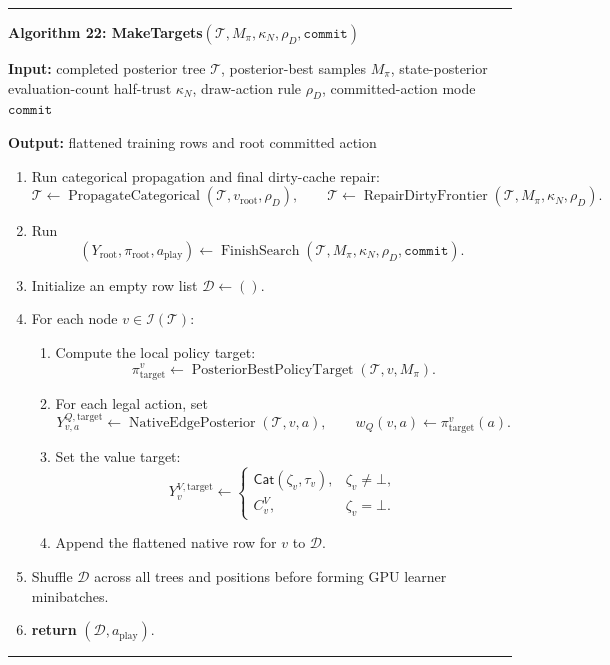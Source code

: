 \documentclass[11pt]{article}
\newcommand{\Tree}{\mathcal{T}}
\newcommand{\Interior}{\mathcal{I}}
\newcommand{\PosteriorBestPolicyTarget}{\operatorname{PosteriorBestPolicyTarget}}
\newcommand{\FinishSearch}{\operatorname{FinishSearch}}
\newcommand{\RepairDirtyFrontier}{\operatorname{RepairDirtyFrontier}}
\newcommand{\CatObj}{\mathsf{Cat}}
\newcommand{\NativeEdgePosterior}{\operatorname{NativeEdgePosterior}}
\newcommand{\PropagateCategorical}{\operatorname{PropagateCategorical}}
\newenvironment{algorithmblock}[1]
{
  \par\medskip
  \noindent\hrule\par\smallskip
  \noindent\textbf{#1}
  \par\smallskip
}
{
  \par\smallskip\noindent\hrule\par\medskip
}
\newcommand{\Input}{\textbf{Input: }}
\newcommand{\Output}{\textbf{Output: }}
\newcommand{\Return}{\textbf{return }}
\begin{document}
\begin{algorithmblock}{Algorithm 22: MakeTargets\((\Tree,M_\pi,\kappa_N,\rho_D,\texttt{commit})\)}

\Input completed posterior tree \(\Tree\), posterior-best samples \(M_\pi\), state-posterior evaluation-count half-trust \(\kappa_N\), draw-action rule \(\rho_D\), committed-action mode \(\texttt{commit}\)

\Output flattened training rows and root committed action

\begin{enumerate}[leftmargin=2em]
  \item Run categorical propagation and final dirty-cache repair:
  \[
  \Tree\gets\PropagateCategorical(\Tree,v_{\mathrm{root}},\rho_D),
  \qquad
  \Tree\gets\RepairDirtyFrontier(\Tree,M_\pi,\kappa_N,\rho_D).
  \]

  \item Run
  \[
  \left(
  Y_{\mathrm{root}},
  \pi_{\mathrm{root}},
  a_{\mathrm{play}}
  \right)
  \gets
  \FinishSearch(\Tree,M_\pi,\kappa_N,\rho_D,\texttt{commit}).
  \]

  \item Initialize an empty row list \(\mathcal{D}\gets()\).

  \item For each node \(v\in\Interior(\Tree)\):

  \begin{enumerate}[leftmargin=2em]
    \item Compute the local policy target:
    \[
    \pi_{\mathrm{target}}^v
    \gets
    \PosteriorBestPolicyTarget(\Tree,v,M_\pi).
    \]

    \item For each legal action, set
    \[
    Y^{Q,\mathrm{target}}_{v,a}
    \gets
    \NativeEdgePosterior(\Tree,v,a),
    \qquad
    w_Q(v,a)
    \gets
    \pi_{\mathrm{target}}^v(a).
    \]

    \item Set the value target:
    \[
    Y^{V,\mathrm{target}}_v
    \gets
    \begin{cases}
    \CatObj(\zeta_v,\tau_v), & \zeta_v\ne\bot,\\
    C^V_v, & \zeta_v=\bot.
    \end{cases}
    \]

    \item Append the flattened native row for \(v\) to \(\mathcal{D}\).
  \end{enumerate}

  \item Shuffle \(\mathcal{D}\) across all trees and positions before forming GPU
  learner minibatches.

  \item \Return \((\mathcal{D},a_{\mathrm{play}})\).
\end{enumerate}

\end{algorithmblock}
\end{document}
